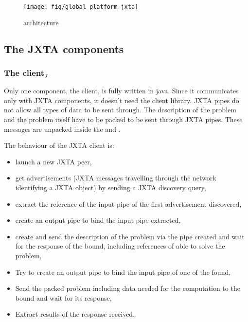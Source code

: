 \begin{figure}[htb]
 \begin{center}
   \texttt{[image: fig/global\_platform\_jxta]}
  \caption{\dietj architecture}
 \end{center}
\end{figure}

\subsection{The JXTA components}
\label{ssec:jxtacomponents}

\subsubsection{The client$_{J}$}
\label{sssec:jxtaclient}

Only one component, the client, is fully written in java. Since it communicates
only with JXTA components, it doesn't need the \diet client library. JXTA pipes
do not allow all types of data to be sent through. The description of the
problem and the problem itself have to be packed to be sent through JXTA
pipes. These messages are unpacked inside the \MAdiet and \seddiet.

The behaviour of the JXTA client is:

\begin {itemize}
\item{launch a new JXTA peer,}
\item{get \MAj advertisements (JXTA messages travelling through the network
  identifying a JXTA object) by sending a JXTA discovery query,}
\item{extract the reference of the input pipe of the first \MAj advertisement
  discovered,}
\item{create an output pipe to bind the input pipe extracted,}
\item{create and send the description of the problem via the pipe created and
  wait for the response of the \MAj bound, including references of \seds able
  to solve the problem,}
\item{Try to create an output pipe to bind the input pipe of one of the \seds
  found,}
\item{Send the packed problem including data needed for the computation to the
  \sed bound and wait for its response,}
\item{Extract results of the response received.}
\end{itemize}


